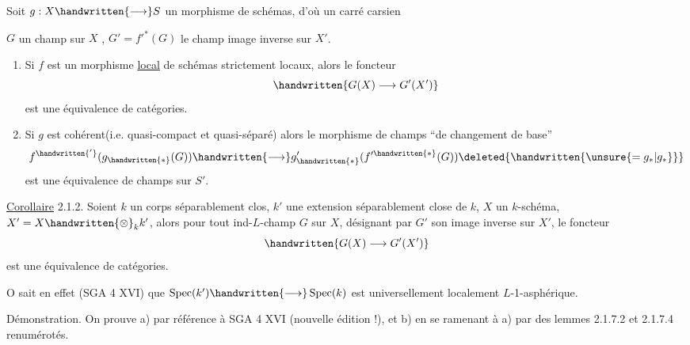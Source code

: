 Soit $g:X\handwritten{\longrightarrow}S$ un morphisme de schémas, d'où un carré carsien

$G$ un champ sur $X$ , $G'=f'^*(G)$ le champ image inverse sur $X'$.

\begin{enumerate}[label=\alph*)]
\item Si  $f$ est un morphisme  \uline{local} de schémas strictement locaux, alors le foncteur
\[
\handwritten{G(X)\longrightarrow G'(X')}
\]
est une équivalence de catégories.

\item Si $g$ est cohérent(i.e. quasi-compact et quasi-séparé) alors le morphisme de champs ``de changement de base''
\[
f^{\handwritten{'}}(g_{\handwritten{*}}(G))\handwritten{\longrightarrow}g'_{\handwritten{*}}(f'^{\handwritten{*}}(G))\deleted{\handwritten{\unsure{=g_*|g_*}}}
\]
est une équivalence de champs sur $S'$.
\end{enumerate}

\uline{Corollaire} 2.1.2. Soient $k$ un corps séparablement clos, $k'$ une extension séparablement close de $k$, $X$ un $k$-schéma, $X'=X\handwritten{\otimes}_k k'$, alors pour tout  ind-\uline{$L$}-champ $G$ sur $X$, désignant par $G'$ son image inverse sur $X'$, le foncteur
\[
\handwritten{G(X)\longrightarrow G'(X')}
\]
est une équivalence de catégories.

O sait en effet (SGA 4 XVI\quad\quad) que $\operatorname{Spec}(k')\handwritten{\longrightarrow}\operatorname{Spec}(k)$ est universellement localement \uline{$L$}-1-asphérique.

Démonstration. On prouve a) par référence à SGA 4 XVI (nouvelle édition !), et b) en se ramenant à a) par des lemmes 2.1.7.2 et 2.1.7.4 renumérotés.

